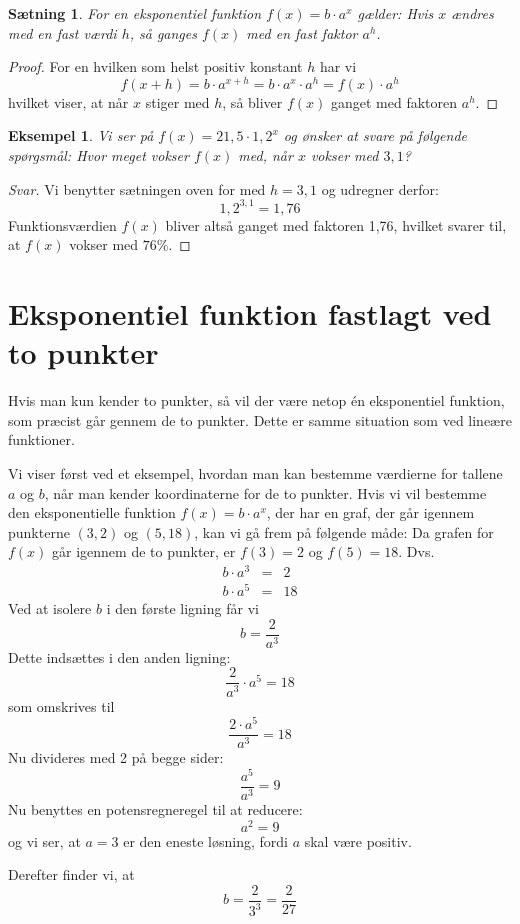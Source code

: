 \documentclass[12pt,oneside,a4paper]{article}
\newcommand{\bas}{\begin{eqnarray*}}
\newcommand{\eas}{\end{eqnarray*}}
\theoremstyle{plain}
\newtheorem*{thm}{Sætning}
\newtheorem*{eks}{Eksempel}
\begin{document}
\begin{thm}
    For en eksponentiel funktion $f(x) = b\cdot a^x$ gælder: Hvis $x$ ændres
    med en fast værdi $h$, så ganges $f(x)$ med en fast faktor $a^h$.
\end{thm}
\begin{proof}
    For en hvilken som helst positiv konstant $h$ har vi
    $$
    f(x+h) = b\cdot a^{x+h} = b\cdot a^x\cdot  a^h = f(x)\cdot  a^h
    $$
    hvilket viser, at når $x$ stiger med $h$, så bliver $f(x)$ ganget med
    faktoren $a^h$. 
\end{proof}

\begin{eks}
    Vi ser på $f(x) = 21,5 \cdot 1,2^x$ og ønsker at svare på følgende
    spørgsmål: Hvor meget vokser $f(x)$ med, når $x$ vokser med $3,1$?
\end{eks}
\begin{proof}[Svar]
    Vi benytter sætningen oven for med $h=3,1$ og udregner derfor:
    $$
    1,2^{3,1} = 1,76 
    $$
    Funktionsværdien $f(x)$ bliver altså ganget med faktoren 1,76, hvilket
    svarer til, at $f(x)$ vokser med $76\%$.
\end{proof}


\section*{Eksponentiel funktion fastlagt ved to punkter}
Hvis man kun kender to punkter, så vil der være netop én eksponentiel funktion,
som præcist går gennem de to punkter. Dette er samme situation som ved lineære
funktioner.

Vi viser først ved et eksempel, hvordan man kan bestemme værdierne for tallene
$a$ og $b$, når man kender koordinaterne for de to punkter.
Hvis vi vil bestemme den eksponentielle funktion $f(x) = b\cdot a^x$, der har en
graf, der går igennem punkterne $(3, 2)$ og $(5, 18)$, kan vi gå frem på
følgende måde:
Da grafen for $f(x)$ går igennem de to punkter, er $f(3) = 2$ og $f(5) = 18$. Dvs.
\bas
b \cdot a^3  &=& 2\\
b \cdot a^5  &=& 18
\eas
Ved at isolere $b$ i den første ligning får vi
$$
b = \frac{2}{a^3}
$$
Dette indsættes i den anden ligning:
$$
\frac{2}{a^3} \cdot a^5 = 18
$$
som omskrives til
$$
\frac{2 \cdot a^5}{a^3} = 18
$$
Nu divideres med 2 på begge sider:
$$
\frac{a^5}{a^3} = 9
$$
Nu benyttes en potensregneregel til at reducere:
$$
a^2 = 9
$$
og vi ser, at $a=3$ er den eneste løsning, fordi $a$ skal være positiv.

Derefter finder vi, at 
$$
b = \frac{2}{3^3} = \frac{2}{27}
$$
\end{document}
